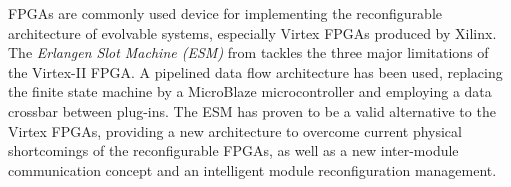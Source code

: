 \label{sec:erlangen}
FPGAs are commonly used device for implementing the reconfigurable architecture of evolvable systems, especially Virtex FPGAs produced by Xilinx. The \emph{Erlangen Slot Machine (ESM)} from \cite{erlangen} tackles the three major limitations of the Virtex-II FPGA. A pipelined data flow architecture has been used, replacing the finite state machine by a MicroBlaze microcontroller and employing a data crossbar between plug-ins. The ESM has proven to be a valid alternative to the Virtex FPGAs, providing a new architecture to overcome current physical shortcomings of the reconfigurable FPGAs, as well as a new inter-module communication concept and an intelligent module reconfiguration management. 
